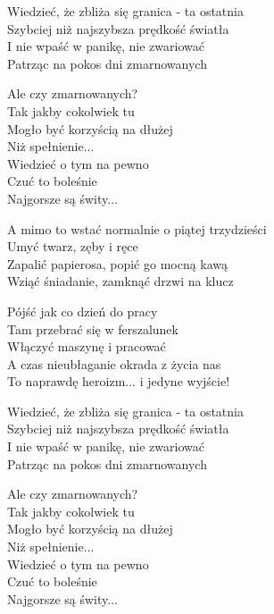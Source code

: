 \begin{text}
    Wiedzieć, że zbliża się granica - ta ostatnia\\
    Szybciej niż najszybsza prędkość światła\\
    I nie wpaść w panikę, nie zwariować\\
    Patrząc na pokos dni zmarnowanych

    Ale czy zmarnowanych?\\
    Tak jakby cokolwiek tu\\
    Mogło być korzyścią na dłużej\\
    Niż spełnienie...\\
    Wiedzieć o tym na pewno\\
    Czuć to boleśnie\\
    Najgorsze są świty...

    A mimo to wstać normalnie o piątej trzydzieści\\
    Umyć twarz, zęby i ręce\\
    Zapalić papierosa, popić go mocną kawą\\
    Wziąć śniadanie, zamknąć drzwi na klucz

    Pójść jak co dzień do pracy\\
    Tam przebrać się w ferszalunek\\
    Włączyć maszynę i pracować\\
    A czas nieubłaganie okrada z życia nas\\
    To naprawdę heroizm... i jedyne wyjście!

    Wiedzieć, że zbliża się granica - ta ostatnia\\
    Szybciej niż najszybsza prędkość światła\\
    I nie wpaść w panikę, nie zwariować\\
    Patrząc na pokos dni zmarnowanych

    Ale czy zmarnowanych?\\
    Tak jakby cokolwiek tu\\
    Mogło być korzyścią na dłużej\\
    Niż spełnienie...\\
    Wiedzieć o tym na pewno\\
    Czuć to boleśnie\\
    Najgorsze są świty...
\end{text}
\begin{chord}

\end{chord}